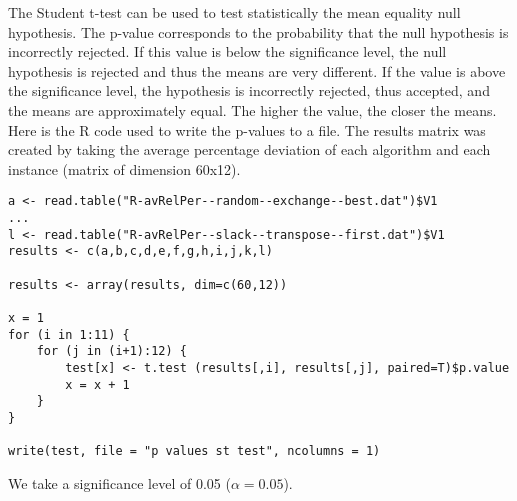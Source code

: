 The Student t-test can be used to test statistically the mean equality null hypothesis. The p-value corresponds to the probability that the null hypothesis is incorrectly rejected. If this value is below the significance level, the null hypothesis is rejected and thus the means are very different. If the value is above the significance level, the hypothesis is incorrectly rejected, thus accepted, and the means are approximately equal. The higher the value, the closer the means.\\

Here is the R code used to write the p-values to a file. The results matrix was created by taking the average percentage deviation of each algorithm and each instance (matrix of dimension 60x12).

\begin{lstlisting}
a <- read.table("R-avRelPer--random--exchange--best.dat")$V1
...
l <- read.table("R-avRelPer--slack--transpose--first.dat")$V1
results <- c(a,b,c,d,e,f,g,h,i,j,k,l)

results <- array(results, dim=c(60,12))

x = 1
for (i in 1:11) {
	for (j in (i+1):12) {
		test[x] <- t.test (results[,i], results[,j], paired=T)$p.value
		x = x + 1
	}
}

write(test, file = "p values st test", ncolumns = 1)
\end{lstlisting}

We take a significance level of 0.05 ($\alpha = 0.05$).


